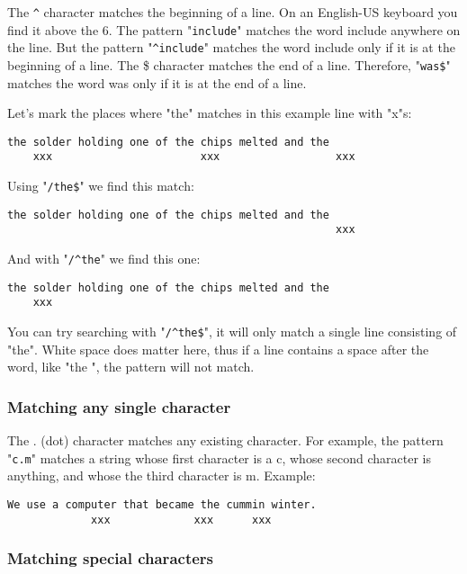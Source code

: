 The \texttt{\^{}} character matches the beginning of a line.
On an English-US keyboard you find it above the 6.
The pattern "\texttt{include}" matches the word include anywhere on the line.
But the pattern "\texttt{\^{}include}" matches the word include only if it is at the beginning of a line.
The \$ character matches the end of a line.
Therefore, "\texttt{was\$}" matches the word was only if it is at the end of a line.

Let's mark the places where "the" matches in this example line with "x"s:

		\begin{Verbatim}[samepage=true]
    the solder holding one of the chips melted and the 
    xxx                       xxx                  xxx
		\end{Verbatim}

Using "\texttt{/the\$}" we find this match:

		\begin{Verbatim}[samepage=true]
    the solder holding one of the chips melted and the 
                                                   xxx
		\end{Verbatim}

And with "\texttt{/\^{}the}" we find this one:

		\begin{Verbatim}[samepage=true]
    the solder holding one of the chips melted and the 
    xxx
		\end{Verbatim}

You can try searching with "\texttt{/\^{}the\$}", it will only match a single line consisting of "the".
White space does matter here, thus if a line contains a space after the word, like "the ", the pattern will not match.

\subsubsection{Matching any single character}

The . (dot) character matches any existing character.
For example, the pattern "\texttt{c.m}" matches a string whose first character is a c, whose second character is anything, and whose the third character is m.
Example:

		\begin{Verbatim}[samepage=true]
    We use a computer that became the cummin winter. 
             xxx             xxx      xxx
		\end{Verbatim}


\subsubsection{Matching special characters}

